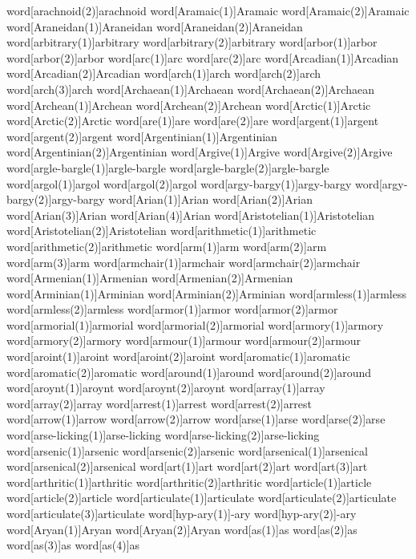 word[arachnoid(2)]{arachnoid}
word[Aramaic(1)]{Aramaic}
word[Aramaic(2)]{Aramaic}
word[Araneidan(1)]{Araneidan}
word[Araneidan(2)]{Araneidan}
word[arbitrary(1)]{arbitrary}
word[arbitrary(2)]{arbitrary}
word[arbor(1)]{arbor}
word[arbor(2)]{arbor}
word[arc(1)]{arc}
word[arc(2)]{arc}
word[Arcadian(1)]{Arcadian}
word[Arcadian(2)]{Arcadian}
word[arch(1)]{arch}
word[arch(2)]{arch}
word[arch(3)]{arch}
word[Archaean(1)]{Archaean}
word[Archaean(2)]{Archaean}
word[Archean(1)]{Archean}
word[Archean(2)]{Archean}
word[Arctic(1)]{Arctic}
word[Arctic(2)]{Arctic}
word[are(1)]{are}
word[are(2)]{are}
word[argent(1)]{argent}
word[argent(2)]{argent}
word[Argentinian(1)]{Argentinian}
word[Argentinian(2)]{Argentinian}
word[Argive(1)]{Argive}
word[Argive(2)]{Argive}
word[argle-bargle(1)]{argle-bargle}
word[argle-bargle(2)]{argle-bargle}
word[argol(1)]{argol}
word[argol(2)]{argol}
word[argy-bargy(1)]{argy-bargy}
word[argy-bargy(2)]{argy-bargy}
word[Arian(1)]{Arian}
word[Arian(2)]{Arian}
word[Arian(3)]{Arian}
word[Arian(4)]{Arian}
word[Aristotelian(1)]{Aristotelian}
word[Aristotelian(2)]{Aristotelian}
word[arithmetic(1)]{arithmetic}
word[arithmetic(2)]{arithmetic}
word[arm(1)]{arm}
word[arm(2)]{arm}
word[arm(3)]{arm}
word[armchair(1)]{armchair}
word[armchair(2)]{armchair}
word[Armenian(1)]{Armenian}
word[Armenian(2)]{Armenian}
word[Arminian(1)]{Arminian}
word[Arminian(2)]{Arminian}
word[armless(1)]{armless}
word[armless(2)]{armless}
word[armor(1)]{armor}
word[armor(2)]{armor}
word[armorial(1)]{armorial}
word[armorial(2)]{armorial}
word[armory(1)]{armory}
word[armory(2)]{armory}
word[armour(1)]{armour}
word[armour(2)]{armour}
word[aroint(1)]{aroint}
word[aroint(2)]{aroint}
word[aromatic(1)]{aromatic}
word[aromatic(2)]{aromatic}
word[around(1)]{around}
word[around(2)]{around}
word[aroynt(1)]{aroynt}
word[aroynt(2)]{aroynt}
word[array(1)]{array}
word[array(2)]{array}
word[arrest(1)]{arrest}
word[arrest(2)]{arrest}
word[arrow(1)]{arrow}
word[arrow(2)]{arrow}
word[arse(1)]{arse}
word[arse(2)]{arse}
word[arse-licking(1)]{arse-licking}
word[arse-licking(2)]{arse-licking}
word[arsenic(1)]{arsenic}
word[arsenic(2)]{arsenic}
word[arsenical(1)]{arsenical}
word[arsenical(2)]{arsenical}
word[art(1)]{art}
word[art(2)]{art}
word[art(3)]{art}
word[arthritic(1)]{arthritic}
word[arthritic(2)]{arthritic}
word[article(1)]{article}
word[article(2)]{article}
word[articulate(1)]{articulate}
word[articulate(2)]{articulate}
word[articulate(3)]{articulate}
word[hyp-ary(1)]{-ary}
word[hyp-ary(2)]{-ary}
word[Aryan(1)]{Aryan}
word[Aryan(2)]{Aryan}
word[as(1)]{as}
word[as(2)]{as}
word[as(3)]{as}
word[as(4)]{as}
